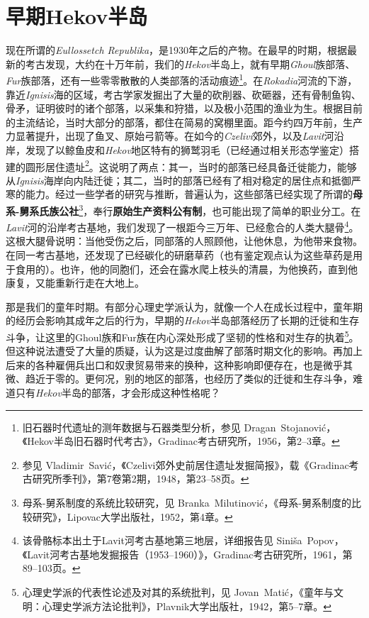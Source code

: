 \chapter{早期Hekov半岛}
现在所谓的\textit{Eullossetch Republika}，是1930年之后的产物。在最早的时期，根据最新的考古发现，大约在十万年前，我们的\textit{Hekov}半岛上，就有早期\textit{Ghoul}族部落、\textit{Fur}族部落，还有一些零零散散的人类部落的活动痕迹\footnote{旧石器时代遗址的测年数据与石器类型分析，参见 Dragan~Stojanović，《Hekov半岛旧石器时代考古》，Gradinac考古研究所，1956，第2--3章。}。在\textit{Rokadia}河流的下游，靠近\textit{Ignisis}海的区域，考古学家发掘出了大量的砍削器、砍砸器，还有骨制鱼钩、骨矛，证明彼时的诸个部落，以采集和狩猎，以及极小范围的渔业为生。根据目前的主流结论，当时大部分的部落，都住在简易的窝棚里面。距今约四万年前，生产力显著提升，出现了鱼叉、原始弓箭等。在如今的\textit{Czelivi}郊外，以及\textit{Lavit}河沿岸，发现了以鲸鱼皮和\textit{Hekov}地区特有的狮鹫羽毛（已经通过相关形态学鉴定）搭建的圆形居住遗址\footnote{参见 Vladimir~Savić，《Czelivi郊外史前居住遗址发掘简报》，载《Gradinac考古研究所季刊》，第7卷第2期，1948，第23--58页。}。这说明了两点：其一，当时的部落已经具备迁徙能力，能够从\textit{Ignisis}海岸向内陆迁徙；其二，当时的部落已经有了相对稳定的居住点和抵御严寒的能力。经过一些学者的研究与推断，普遍认为，这些部落已经实现了所谓的\textbf{母系-舅系氏族公社}\footnote{母系-舅系制度的系统比较研究，见 Branka~Milutinović，《母系-舅系制度的比较研究》，Lipovac大学出版社，1952，第4章。}，奉行\textbf{原始生产资料公有制}，也可能出现了简单的职业分工。在\textit{Lavit}河的沿岸考古基地，我们发现了一根距今三万年、已经愈合的人类大腿骨\footnote{该骨骼标本出土于Lavit河考古基地第三地层，详细报告见 Siniša~Popov，《Lavit河考古基地发掘报告（1953--1960）》，Gradinac考古研究所，1961，第89--103页。}。这根大腿骨说明：当他受伤之后，同部落的人照顾他，让他休息，为他带来食物。在同一考古基地，还发现了已经碳化的研磨草药（也有鉴定观点认为这些草药是用于食用的）。也许，他的同胞们，还会在露水爬上枝头的清晨，为他换药，直到他康复，又能重新行走在大地上。

那是我们的童年时期。有部分心理史学派认为，就像一个人在成长过程中，童年期的经历会影响其成年之后的行为，早期的\textit{Hekov}半岛部落经历了长期的迁徙和生存斗争，让这里的Ghoul族和Fur族在内心深处形成了坚韧的性格和对生存的执着\footnote{心理史学派的代表性论述及对其的系统批判，见 Jovan~Matić，《童年与文明：心理史学派方法论批判》，Plavnik大学出版社，1942，第5--7章。}。但这种说法遭受了大量的质疑，认为这是过度曲解了部落时期文化的影响。再加上后来的各种雇佣兵出口和奴隶贸易带来的换种，这种影响即便存在，也是微乎其微、趋近于零的。更何况，别的地区的部落，也经历了类似的迁徙和生存斗争，难道只有\textit{Hekov}半岛的部落，才会形成这种性格呢？

